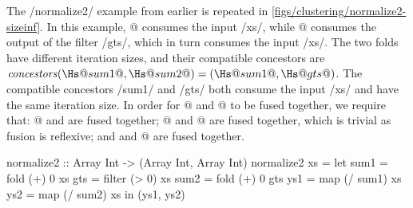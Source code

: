 The \Hs/normalize2/ example from earlier is repeated in \cref{figs/clustering/normalize2-sizeinf}.
In this example, @ consumes the input \Hs/xs/, while @ consumes the output of the filter \Hs/gts/, which in turn consumes the input \Hs/xs/.
The two folds have different iteration sizes, and their compatible concestors are $\concestors(\Hs@sum1@, \Hs@sum2@) = (\Hs@sum1@, \Hs@gts@)$.
The compatible concestors \Hs/sum1/ and \Hs/gts/ both consume the input \Hs/xs/ and have the same iteration size.
In order for @ and @ to be fused together, we require that: @ and \Hs@gts@ are fused together; @ and @ are fused together, which is trivial as fusion is reflexive;  and \Hs@gts@ and @ are fused together.

\begin{haskell}[float,label=figs/clustering/normalize2-sizeinf,caption=Normalize2 function]
normalize2 :: Array Int -> (Array Int, Array Int)
normalize2 xs
 = let sum1 = fold   (+)  0   xs
       gts  = filter (>   0)  xs
       sum2 = fold   (+)  0   gts
       ys1  = map    (/ sum1) xs
       ys2  = map    (/ sum2) xs
   in (ys1, ys2)
\end{haskell}

